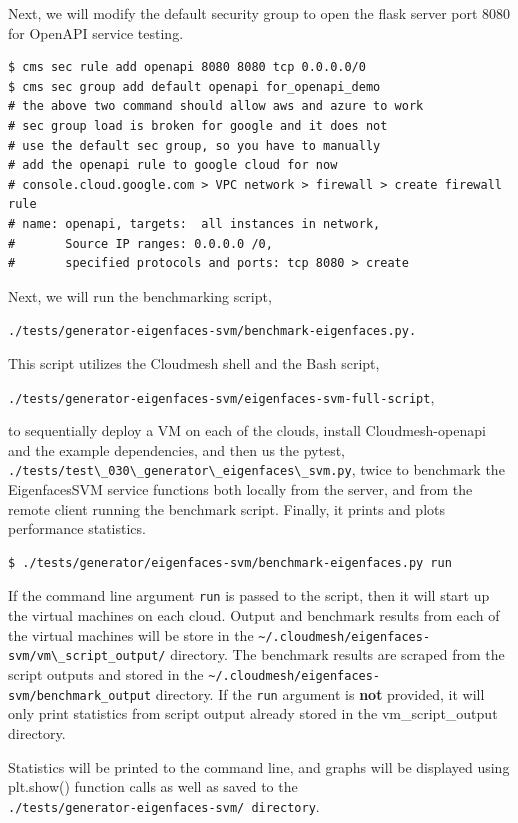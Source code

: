 Next, we will modify the default security group to open the flask server
port 8080 for OpenAPI service testing.

\begin{verbatim}
$ cms sec rule add openapi 8080 8080 tcp 0.0.0.0/0
$ cms sec group add default openapi for_openapi_demo
# the above two command should allow aws and azure to work
# sec group load is broken for google and it does not 
# use the default sec group, so you have to manually 
# add the openapi rule to google cloud for now
# console.cloud.google.com > VPC network > firewall > create firewall rule
# name: openapi, targets:  all instances in network, 
#       Source IP ranges: 0.0.0.0 /0, 
#       specified protocols and ports: tcp 8080 > create
\end{verbatim}

Next, we will run the benchmarking script,

\verb|./tests/generator-eigenfaces-svm/benchmark-eigenfaces.py.|

This script utilizes the Cloudmesh shell and the Bash script,

\verb|./tests/generator-eigenfaces-svm/eigenfaces-svm-full-script|,

to sequentially deploy a VM on each of the clouds, install
Cloudmesh-openapi and the example dependencies, and then us the
pytest, \\
\verb|./tests/test\_030\_generator\_eigenfaces\_svm.py|, twice to
benchmark the EigenfacesSVM service functions both locally from the
server, and from the remote client running the benchmark
script. Finally, it prints and plots performance statistics.

\begin{verbatim}
$ ./tests/generator/eigenfaces-svm/benchmark-eigenfaces.py run
\end{verbatim}

If the command line argument \verb|run| is passed to the script, then
it will start up the virtual machines on each cloud. Output and
benchmark results from each of the virtual machines will be store in the
\verb|~/.cloudmesh/eigenfaces-svm/vm\_script_output/| directory.
The benchmark results are scraped from the script outputs and stored in
the \verb|~/.cloudmesh/eigenfaces-svm/benchmark_output|
directory. If the \verb|run| argument is \textbf{not} provided, it
will only print statistics from script output already stored in the
vm\_script\_output directory.

Statistics will be printed to the command line, and graphs will be
displayed using plt.show() function calls as well as saved to the \\
\verb|./tests/generator-eigenfaces-svm/ directory|.

